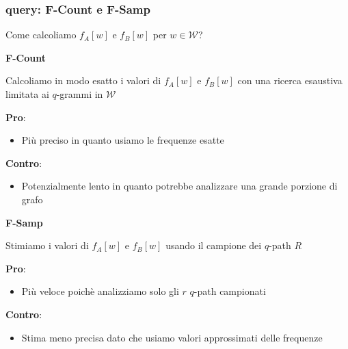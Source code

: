 \begin{frame}
	\frametitle{query: F-Count e F-Samp}
	\centering
	
	Come calcoliamo $f_A[w]$ e $f_B[w]$ per $w \in \mathcal{W}$?\medskip
	
	\pause
	
	\begin{minipage}{.45\textwidth}
		\centering
		\textbf{F-Count}
		
		Calcoliamo in modo esatto i valori di $f_A[w]$ e $f_B[w]$
		con una ricerca esaustiva limitata ai $q$-grammi in $\mathcal{W}$
		
		\bigskip
		
		\small		
		\textbf{Pro}:
		\begin{itemize}
			\item Più preciso in quanto usiamo le frequenze esatte
		\end{itemize}
		
		\textbf{Contro}:
		\begin{itemize}
			\item Potenzialmente lento in quanto potrebbe analizzare una grande porzione di grafo
		\end{itemize}
		
		\hfill
	\end{minipage}\hfill
	\pause
	\begin{minipage}{.45\textwidth}
		\centering
		\textbf{F-Samp}	
		
		 Stimiamo i valori di $f_A[w]$ e $f_B[w]$ 
		 usando il campione dei $q$-path $R$
		 
		 
		 \bigskip
		 
		 \small		
		 \textbf{Pro}:
		 \begin{itemize}
		 	\item Più veloce poichè analizziamo solo gli $r$ $q$-path campionati
		 \end{itemize}
		 
		 \textbf{Contro}:
		 \begin{itemize}
		 	\item Stima meno precisa dato che usiamo valori approssimati delle frequenze
		 \end{itemize}
		 
		\hfill
	\end{minipage}\hfill
	
\end{frame}

